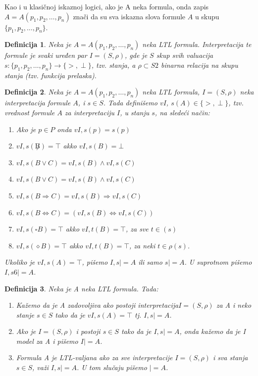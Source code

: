 \documentclass[a4paper]{article}
\newtheorem{definicija}{Definicija}[section]
\begin{document}
{	Kao i u klasičnoj iskaznoj logici, ako je A neka formula, onda zapis $A = A(p_1, p_2, \dots , p_n)$ znači da su sva iskazna slova formule $A$ u skupu $\{p_1, p_2, \dots , p_n\}$.
\begin{definicija}
Neka je $A = A(p_1, p_2, \dots , p_n)$ neka LTL formula. Interpretacija te formule je svaki uređen par $I = (S, \rho)$, gde je $S$ skup svih valuacija $s : \{p_1, p_2, \dots , p_n\} \to \{>, \perp \}$, tzv. stanja, a $\rho \subset S2$ binarna relacija na skupu stanja (tzv. funkcija prelaska).
\end{definicija}
\begin{definicija}    
Neka je $A = A(p_1, p_2, \dots , p_n)$ neka LTL formula, $I = (S, \rho)$ neka interpretacija formule $A$, i $s \in S$. Tada definišemo $vI$, $s(A) \in \{>, \perp \}$, tzv. vrednost formule $A$ za interpretaciju $I$, u stanju $s$, na sledeći način:
\begin{enumerate}	
\item  Ako je $p \in P$ onda $vI,s(p) = s(p)$
\item $vI,s(\not B) = \top$ akko $vI,s(B) = \bot$
\item  $vI,s(B \vee C) = vI,s(B) \wedge vI,s(C)$
\item  $vI,s(B \vee C) = vI,s(B) \wedge vI,s(C)$
\item $vI,s(B \Rightarrow C) = vI,s(B) \Rightarrow vI,s(C)$
\item $vI,s(B \Leftrightarrow C) = (vI,s(B) \Leftrightarrow vI,s(C))$
\item  $vI,s(\square B) = \top$ akko $vI,t(B) = \top$, za sve $t \in (s)$
\item $vI,s(\diamond B) = \top$ akko $vI,t(B) = \top$, za neki $t \in \rho(s)$.
\end{enumerate}	
Ukoliko je $vI,s(A) = \top$, pišemo $I, s |= A$ ili samo $s |= A$. U suprotnom pišemo $I, s 6|= A$.
\end{definicija} 
\begin{definicija}
Neka je A neka LTL formula. Tada:
\begin{enumerate}	
\item Kažemo da je A zadovoljiva ako postoji interpretacija$I = (S, \rho)$ za A i neko stanje $s \in S$ tako da je $vI,s(A) = \top$ tj. $I, s |= A$.
\item Ako je $I = (S, \rho)$ i postoji $s \in S$ tako da je $I, s |= A$, onda kažemo da je I model za A i pišemo $I |= A$.
\item Formula A je LTL-valjana ako za sve interpretacije $I = (S, \rho)$ i sva stanja $s \in S$, važi $I, s |= A$. U tom slučaju pišemo $|= A$.\end{enumerate}	
\end{definicija}

}
\end{document}
